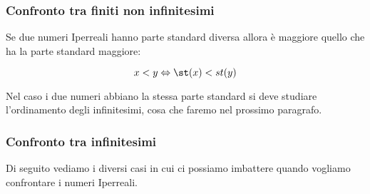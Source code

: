 \subsubsection{Confronto tra finiti non infinitesimi}
\label{subsubsec:insnum_confrontoreali}

Se due numeri Iperreali hanno parte standard diversa allora è maggiore quello 
che ha la parte standard maggiore:

\[x < y \Leftrightarrow \st(x) < st(y)\]

Nel caso i due numeri abbiano la stessa parte standard si deve studiare 
l'ordinamento degli infinitesimi, cosa che faremo nel prossimo paragrafo.

\subsubsection{Confronto tra infinitesimi}
\label{subsubsec:insnum_confrontoreali}

Di seguito vediamo i diversi casi in cui ci possiamo 
imbattere quando vogliamo confrontare i numeri Iperreali.

